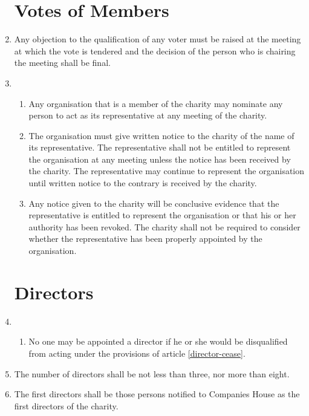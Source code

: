 \begin{enumerate}
\section{Votes of Members}

\item
  Any objection to the qualification of any voter must be raised at
  the meeting at which the vote is tendered and the decision of the
  person who is chairing the meeting shall be final.
\item
  \begin{enumerate}
  \item
    Any organisation that is a member of the charity may nominate any
    person to act as its representative at any meeting of the charity.
  \item
    The organisation must give written notice to the charity of the
    name of its representative. The representative shall not be
    entitled to represent the organisation at any meeting unless the
    notice has been received by the charity. The representative may
    continue to represent the organisation until written notice to the
    contrary is received by the charity.
  \item
    Any notice given to the charity will be conclusive evidence that
    the representative is entitled to represent the organisation or
    that his or her authority has been revoked. The charity shall not
    be required to consider whether the representative has been
    properly appointed by the organisation.
  \end{enumerate}

\section{Directors}

\item
  \begin{enumerate}
    A director must be a natural person aged 16 years or older.
  \item
    No one may be appointed a director if he or she would be
    disqualified from acting under the provisions of article \ref{director-cease}.
  \end{enumerate}
\item
  The number of directors shall be not less than three, nor more than eight.

\item
  The first directors shall be those persons notified to Companies
  House as the first directors of the charity.


\end{enumerate}
